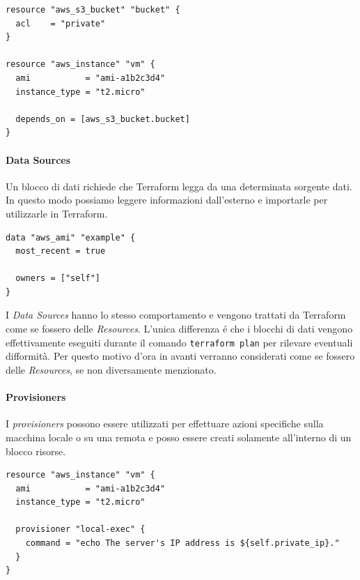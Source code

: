 \documentclass[12pt, a4paper, titlepage]{article}
\newenvironment{code}{\captionsetup{type=listing}}{}
\begin{document}
 \begin{code}
	\begin{verbatim}
resource "aws_s3_bucket" "bucket" {
  acl    = "private"
}

resource "aws_instance" "vm" {
  ami           = "ami-a1b2c3d4"
  instance_type = "t2.micro"

  depends_on = [aws_s3_bucket.bucket]
}
	\end{verbatim}
\end{code}

\paragraph{Data Sources} Un blocco di dati richiede che Terraform legga da una determinata sorgente dati. In questo modo possiamo leggere informazioni dall'esterno e importarle per utilizzarle in Terraform.

 \begin{code}
	\begin{verbatim}
data "aws_ami" "example" {
  most_recent = true

  owners = ["self"]
}
	\end{verbatim}
\end{code}
\bigskip

\begin{tcolorbox}
I \textit{Data Sources} hanno lo stesso comportamento e vengono trattati da Terraform come se fossero delle \textit{Resources}. L'unica differenza é che i blocchi di dati vengono effettivamente eseguiti durante il comando \texttt{terraform plan} per rilevare eventuali difformità. Per questo motivo d'ora in avanti verranno considerati come se fossero delle \textit{Resources}, se non diversamente menzionato.
\end{tcolorbox}

\paragraph{Provisioners} I \textit{provisioners} possono essere utilizzati per effettuare azioni specifiche sulla macchina locale o su una remota e posso essere creati solamente all'interno di un blocco risorse.

 \begin{code}
	\begin{verbatim}
resource "aws_instance" "vm" {
  ami           = "ami-a1b2c3d4"
  instance_type = "t2.micro"

  provisioner "local-exec" {
    command = "echo The server's IP address is ${self.private_ip}."
  }
}
	\end{verbatim}
\end{code}
\bigskip
\end{document}
